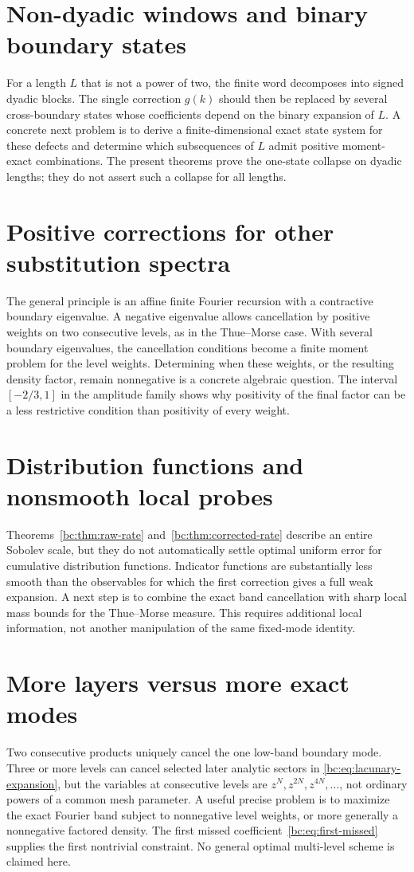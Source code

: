 \documentclass[11pt,a4paper,oneside,openany]{book}
\numberwithin{equation}{chapter}
\theoremstyle{definition}
\theoremstyle{remark}
\begin{document}
\section{Non-dyadic windows and binary boundary states}
For a length $L$ that is not a power of two, the finite word decomposes into
signed dyadic blocks. The single correction $g(k)$ should then be replaced by
several cross-boundary states whose coefficients depend on the binary expansion
of $L$. A concrete next problem is to derive a finite-dimensional exact state
system for these defects and determine which subsequences of $L$ admit positive
moment-exact combinations. The present theorems prove the one-state collapse
on dyadic lengths; they do not assert such a collapse for all lengths.

\section{Positive corrections for other substitution spectra}
The general principle is an affine finite Fourier recursion with a contractive
boundary eigenvalue. A negative eigenvalue allows cancellation by positive
weights on two consecutive levels, as in the Thue--Morse case. With several
boundary eigenvalues, the cancellation conditions become a finite moment problem
for the level weights. Determining when these weights, or the resulting density
factor, remain nonnegative is a concrete algebraic question. The interval
$[-2/3,1]$ in the amplitude family shows why positivity of the final factor can
be a less restrictive condition than positivity of every weight.

\section{Distribution functions and nonsmooth local probes}
Theorems~\ref{bc:thm:raw-rate} and~\ref{bc:thm:corrected-rate} describe an entire
Sobolev scale, but they do not automatically settle optimal uniform error for
cumulative distribution functions. Indicator functions are substantially less
smooth than the observables for which the first correction gives a full weak
expansion. A next step is to combine the exact band cancellation with sharp
local mass bounds for the Thue--Morse measure. This requires additional local
information, not another manipulation of the same fixed-mode identity.

\section{More layers versus more exact modes}
Two consecutive products uniquely cancel the one low-band boundary mode.
Three or more levels can cancel selected later analytic sectors in
\eqref{bc:eq:lacunary-expansion}, but the variables at consecutive levels are
$z^N,z^{2N},z^{4N},\ldots$, not ordinary powers of a common mesh parameter.
A useful precise problem is to maximize the exact Fourier band subject to
nonnegative level weights, or more generally a nonnegative factored density.
The first missed coefficient~\eqref{bc:eq:first-missed} supplies the first
nontrivial constraint. No general optimal multi-level scheme is claimed here.
\end{document}
